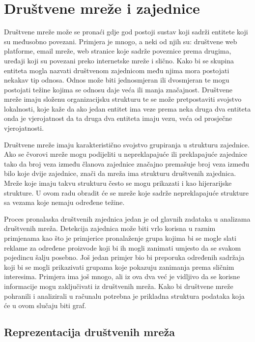 \documentclass[times, utf8, diplomski]{fer}
\begin{document}
%
\chapter{Društvene mreže i zajednice}

Društvene mreže može se pronaći gdje god postoji sustav koji sadrži entitete koji su međusobno povezani. Primjera je mnogo, a neki od njih su: društvene web platforme, email mreže, web stranice koje sadrže poveznice prema drugima, uređaji koji su povezani preko internetske mreže i slično. 
Kako bi se skupina entiteta mogla nazvati društvenom zajednicom među njima mora postojati nekakav tip odnosa. Odnos može biti jednosmjeran ili dvosmjeran te mogu postojati težine kojima se odnosu daje veća ili manja značajnost. Društvene mreže imaju složenu organizacijsku strukturu te se može pretpostaviti svojstvo lokalnosti, koje kaže da ako jedan entitet ima veze prema neka druga dva entiteta onda je vjerojatnost da ta druga dva entiteta imaju vezu, veća od prosječne vjerojatnosti. 

Društvene mreže imaju karakteristično svojstvo grupiranja u strukturu zajednice. Ako se čvorovi mreže mogu podijeliti u nepreklapajuće ili preklapajuće zajednice tako da broj veza između članova zajednice značajno premašuje broj veza između bilo koje dvije zajednice, znači da mreža ima strukturu društvenih zajednica. Mreže koje imaju takvu strukturu često se mogu prikazati i kao hijerarijske strukture. U ovom radu obradit će se mreže koje sadrže nepreklapajuće strukture sa vezama koje nemaju određene težine.

Proces pronalaska društvenih zajednica jedan je od glavnih zadataka u analizama društvenih mreža. Detekcija zajednica može biti vrlo korisna u raznim primjenama kao što je primjerice pronalaženje grupa kojima bi se mogle slati reklame za određene proizvode koji bi ih mogli zanimati umjesto da se svakom pojedincu šalju posebno. Još jedan primjer bio bi preporuka određenih sadržaja koji bi se mogli prikazivati grupama koje pokazuju zanimanja prema sličnim interesima. Primjera ima još mnogo, ali iz ova dva već je vidljivo da se korisne informacije mogu zaključivati iz društvenih mreža. Kako bi društvene mreže pohranili i analizirali u računalu potrebna je prikladna struktura podataka koja će u ovom slučaju biti graf.

\section{Reprezentacija društvenih mreža}
\end{document}
